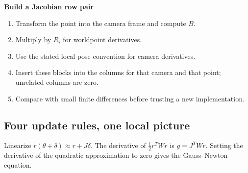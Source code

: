 \documentclass[letterpaper,11pt,english,openany,oneside]{jupyterBook}
\begin{document}
\begin{TextbookBox}
\textbf{Build a Jacobian row pair}\par\smallskip
\begin{enumerate}
%
\item {}
\sphinxAtStartPar
Transform the point into the camera frame and compute \(B\).

\item {}
\sphinxAtStartPar
Multiply by \(R_i\) for world\sphinxhyphen{}point derivatives.

\item {}
\sphinxAtStartPar
Use the stated local pose convention for camera derivatives.

\item {}
\sphinxAtStartPar
Insert these blocks into the columns for that camera and that point; unrelated columns are zero.

\item {}
\sphinxAtStartPar
Compare with small finite differences before trusting a new implementation.

\end{enumerate}

\end{TextbookBox}


\subsection{Four update rules, one local picture}
\label{\detokenize{lectures/lecture06/optimization:four-update-rules-one-local-picture}}
\sphinxAtStartPar
Linearize \(r(\theta+\delta)\approx r+J\delta\). The derivative of \(\tfrac12r^TWr\) is \(g=J^TWr\). Setting the derivative of the quadratic approximation to zero gives the Gauss–Newton equation.
\end{document}
